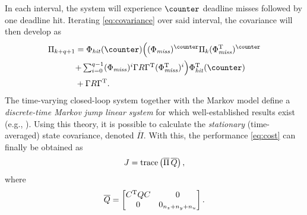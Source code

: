 In each interval, the system will experience $\counter$ deadline misses followed by one deadline hit. Iterating \eqref{eq:covariance} over said interval, the covariance will then develop as
\begin{equation*}
    \label{eq:intervalP}
    \begin{aligned}
    \Pi_{k+q+1} &= \Phi_\mathit{hit}(\counter)  \Bigl((\Phi_\mathit{miss})^\counter \Pi_k (\Phi_\mathit{miss}^{\T})^\counter \Bigr.\\
    &\Bigl.+ \textstyle\sum_{i=0}^{q-1} (\Phi_\mathit{miss})^i \Gamma R \Gamma^{\T} (\Phi_\mathit{miss}^{\T})^i \Bigr)\Phi_\mathit{hit}^{\T}(\counter)  \\
    &+ \Gamma R \Gamma^{\T} .
    \end{aligned}
\end{equation*}
The time-varying closed-loop system together with the Markov model define a \emph{discrete-time Markov jump linear system} for which well-established results exist (e.g., \cite{Blair:1975,Nilsson:1998,Lincoln:2002}). Using this theory, it is possible to calculate the \emph{stationary} (time-averaged) state covariance, denoted $\overline\Pi$. With this, the performance \eqref{eq:cost} can finally be obtained as
\begin{equation*}
    J = \operatorname{trace} \left(  \overline\Pi \, \overline{Q}  \right),
\end{equation*}
where
\begin{equation*}
    \overline{Q} = \begin{bmatrix}
    C^{\mathrm{\small{T}}}Q C & 0 \\ 0 & 0_{n_z+n_y+n_u}
    \end{bmatrix}.
\end{equation*}

